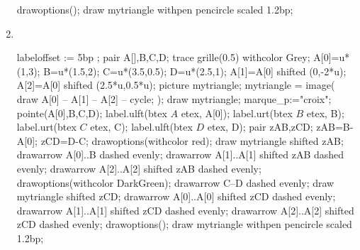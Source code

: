 \begin{corrige}
\begin{changemargin}{-15mm}{0mm}
\begin{multicols}{2}
\begin{enumerate}
\begin{Geometrie}[CoinHD={(4u,4u)}]
                    drawoptions();
                    draw mytriangle withpen pencircle scaled 1.2bp;
                \end{Geometrie}
                \columnbreak
                \item \phantom{rrr}\\
                \begin{Geometrie}[CoinHD={(4u,4u)}]
                    labeloffset := 5bp ;
                    pair A[],B,C,D;
                    trace grille(0.5) withcolor Grey;
                    A[0]=u*(1,3);
                    B=u*(1.5,2);
                    C=u*(3.5,0.5);
                    D=u*(2.5,1);
                    A[1]=A[0] shifted (0,-2*u);
                    A[2]=A[0] shifted (2.5*u,0.5*u);
                    picture mytriangle;
                    mytriangle = image( 
                        draw A[0] -- A[1] -- A[2] -- cycle;
                    );
                    draw mytriangle;
                    marque_p:="croix";
                    pointe(A[0],B,C,D);
                    label.ulft(btex $A$ etex, A[0]);
                    label.urt(btex $B$ etex, B);
                    label.urt(btex $C$ etex, C);
                    label.ulft(btex $D$ etex, D);
                    pair zAB,zCD;
                    zAB=B-A[0];
                    zCD=D-C;
                    drawoptions(withcolor red);
                    draw mytriangle shifted zAB;
                    drawarrow A[0]..B dashed evenly;
                    drawarrow A[1]..A[1] shifted zAB dashed evenly;
                    drawarrow A[2]..A[2] shifted zAB dashed evenly;
                    drawoptions(withcolor DarkGreen);
                    drawarrow C--D dashed evenly;
                    draw mytriangle shifted zCD;
                    drawarrow A[0]..A[0] shifted zCD dashed evenly;
                    drawarrow A[1]..A[1] shifted zCD dashed evenly;
                    drawarrow A[2]..A[2] shifted zCD dashed evenly;
                    drawoptions();
                    draw mytriangle withpen pencircle scaled 1.2bp;                                        
                \end{Geometrie}
            \end{enumerate}
        \end{multicols}    
    \end{changemargin}
\end{corrige}

